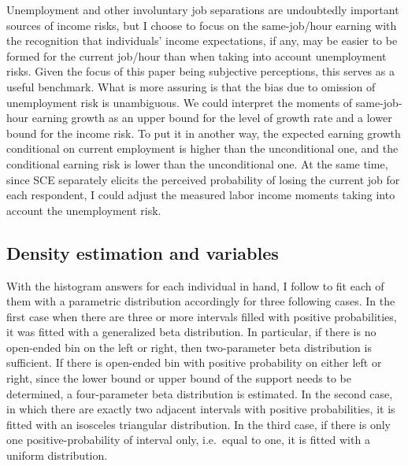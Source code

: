 Unemployment and other involuntary job separations are undoubtedly
important sources of income risks, but I choose to focus on the
same-job/hour earning with the recognition that individuals' income
expectations, if any, may be easier to be formed for the current
job/hour than when taking into account unemployment risks. Given the
focus of this paper being subjective perceptions, this serves as a
useful benchmark. What is more assuring is that the bias due to omission
of unemployment risk is unambiguous. We could interpret the moments of
same-job-hour earning growth as an upper bound for the level of growth
rate and a lower bound for the income risk. To put it in another way,
the expected earning growth conditional on current employment is higher
than the unconditional one, and the conditional earning risk is lower
than the unconditional one. At the same time, since SCE separately
elicits the perceived probability of losing the current job for each
respondent, I could adjust the measured labor income moments taking into
account the unemployment risk.

\hypertarget{density-estimation-and-variables}{%
\subsection{Density estimation and
variables}\label{density-estimation-and-variables}}


With the histogram answers for each individual in hand, I follow
\cite{engelberg_comparing_2009} to fit each of them with a parametric
distribution accordingly for three following cases. In the first case
when there are three or more intervals filled with positive
probabilities, it was fitted with a generalized beta distribution. In
particular, if there is no open-ended bin on the left or right, then
two-parameter beta distribution is sufficient. If there is
open-ended bin with positive probability on either left or right, since the lower bound or upper
bound of the support needs to be determined, a four-parameter beta
distribution is estimated. In the second case, in which there are
exactly two adjacent intervals with positive probabilities, it is fitted
with an isosceles triangular distribution. In the third case, if there
is only one positive-probability of interval only, i.e.~equal to one, it
is fitted with a uniform distribution.

